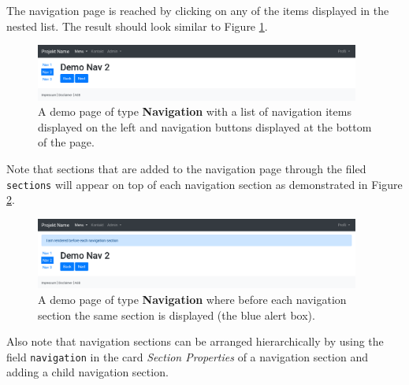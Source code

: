 \documentclass[a4paper,oneside]{book}
\begin{document}
The navigation page  is reached by clicking on any of the items displayed in the nested list.
The result should look similar to Figure \ref{fig.demo-nav-page}.

\begin{figure}[ht]
    \centering
    \includegraphics[width=0.95\textwidth]{demo-nav-page.png}
    \caption{A demo page of type \textbf{Navigation} with a list of navigation items displayed on the left and navigation buttons displayed at the bottom of the page.}
    \label{fig.demo-nav-page}
\end{figure}

Note that sections that are added to the navigation page  through the filed \texttt{sections} will appear on top of each navigation section as demonstrated in Figure \ref{fig.demo-nav-page-head}.

\begin{figure}[ht]
    \centering
    \includegraphics[width=0.95\textwidth]{demo-nav-page-head.png}
    \caption{A demo page of type \textbf{Navigation} where before each navigation section the same section is displayed (the blue alert box).}
    \label{fig.demo-nav-page-head}
\end{figure}

Also note that navigation sections can be arranged hierarchically by using the field \texttt{navigation} in the card \emph{Section Properties} of a navigation section and adding a child navigation section.

\end{document}
